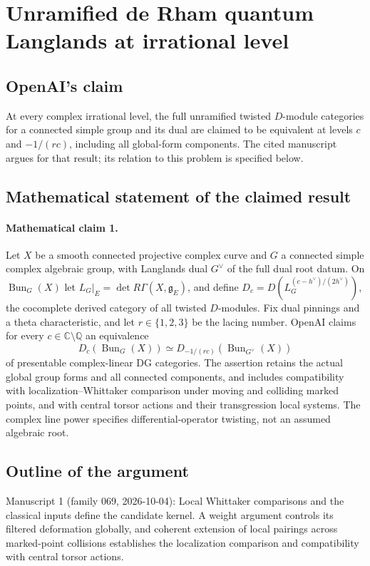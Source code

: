 \documentclass[11pt]{article}
\begin{document}
\section*{Unramified de Rham quantum Langlands at irrational level}

\subsection{OpenAI's claim}
At every complex irrational level, the full unramified twisted $D$-module categories for a connected simple group and its dual are claimed to be equivalent at levels $c$ and $-1/(rc)$, including all global-form components. The cited manuscript argues for that result; its relation to this problem is specified below.

\subsection{Mathematical statement of the claimed result}
\paragraph{Mathematical claim 1.} Let $X$ be a smooth connected projective complex curve and $G$ a connected simple complex algebraic group, with Langlands dual $G^\vee$ of the full dual root datum. On $\operatorname{Bun}_G(X)$ let $L_G|_E=\det R\Gamma(X,\mathfrak g_E)$, and define $D_c=D(L_G^{(c-h^\vee)/(2h^\vee)})$, the cocomplete derived category of all twisted $D$-modules. Fix dual pinnings and a theta characteristic, and let $r\in\{1,2,3\}$ be the lacing number. OpenAI claims for every $c\in\mathbb C\setminus\mathbb Q$ an equivalence
\[
D_c(\operatorname{Bun}_G(X))\simeq D_{-1/(rc)}(\operatorname{Bun}_{G^\vee}(X))
\]
of presentable complex-linear DG categories. The assertion retains the actual global group forms and all connected components, and includes compatibility with localization--Whittaker comparison under moving and colliding marked points, and with central torsor actions and their transgression local systems. The complex line power specifies differential-operator twisting, not an assumed algebraic root.

\subsection{Outline of the argument}
Manuscript 1 (family 069, 2026-10-04): Local Whittaker comparisons and the classical inputs define the candidate kernel. A weight argument controls its filtered deformation globally, and coherent extension of local pairings across marked-point collisions establishes the localization comparison and compatibility with central torsor actions.
\end{document}
